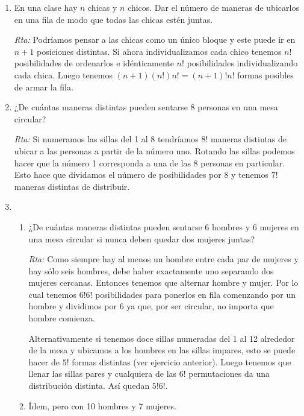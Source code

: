 \begin{enumerate}
    
    
    \item En una clase hay $n$ chicas y $n$ chicos. Dar el número de maneras de ubicarlos en una fila de modo que todas las chicas estén juntas.
    
    \noindent\textit{Rta:} Podríamos pensar a las chicas como un único bloque y este puede ir en $n+1$ posiciones distintas. Si ahora individualizamos cada chico tenemos $n!$ posibilidades de ordenarlos e idénticamente $n!$ posibilidades individualizando cada chica. Luego tenemos $(n+1)(n!)n!=(n+1)!n!$ formas posibles de armar la fila.
    
    
    
    \item ¿De cuántas maneras distintas pueden sentarse 8 personas en una mesa circular?
    
    \noindent\textit{Rta:} Si numeramos las sillas del 1 al 8 tendríamos $8!$ maneras distintas de ubicar a las personas a partir de la número uno. Rotando las sillas podemos hacer que la número 1 corresponda a una de las 8 personas en particular. Esto hace que dividamos el número de posibilidades por 8 y tenemos $7!$ maneras distintas de distribuir.
    
    
    
    \item 
    \begin{enumerate}
    \item 
    ¿De cuántas maneras distintas pueden sentarse 6 hombres y 6 mujeres en una
    mesa circular si nunca deben quedar dos mujeres juntas?
    
    \noindent\textit{Rta:} Como siempre hay al menos un hombre entre cada par de mujeres y hay sólo seis hombres, debe haber exactamente uno separando dos mujeres cercanas. Entonces tenemos que alternar hombre y mujer. Por lo cual tenemos $6!6!$ posibilidades para ponerlos en fila comenzando por un hombre y dividimos por 6 ya que, por ser circular, no importa que hombre comienza. 
    
    Alternativamente si tenemos doce sillas numeradas del 1 al 12 alrededor de la mesa y ubicamos a los hombres en las sillas impares, esto se puede hacer de $5!$ formas distintas (ver ejercicio anterior). Luego tenemos que llenar las sillas pares y cualquiera de las $6!$ permutaciones da una distribución distinta. Así quedan $5!6!$.
    
    \item Ídem, pero con 10 hombres y 7 mujeres.
    

\end{enumerate}
\end{enumerate}
